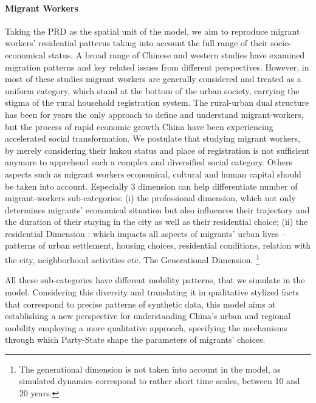 \paragraph{Migrant Workers}
Taking the PRD as the spatial unit of the model, we aim to reproduce migrant workers’ residential patterns taking into account the full range of their socio-economical status. A broad range of Chinese and western studies have examined migration patterns and key related issues from different perspectives. However, in most of these studies migrant workers are generally considered and treated as a uniform category, which stand at the bottom of the urban society, carrying the stigma of the rural household registration system. The rural-urban dual structure has been for years the only approach to define and understand migrant-workers, but the process of rapid economic growth China have been experiencing accelerated social transformation. We postulate that studying migrant workers, by merely considering their hukou status and place of registration is not sufficient anymore to apprehend such a complex and diversified social category. Others aspects such as migrant workers economical, cultural and human capital should be taken into account.
Especially 3 dimension can help differentiate number of migrant-workers sub-categories: (i) the professional dimension, which not only determines migrants’ economical situation but also influences their trajectory and the duration of their staying in the city as well as their residential choice; (ii) the residential Dimension : which impacts all aspects of migrants’ urban lives – patterns of urban settlement, housing choices, residential conditions, relation with the city, neighborhood activities etc. The Generational Dimension.  \footnote {The generational dimension is not taken into account in the model, as simulated dynamics correspond to rather short time scales, between 10 and 20 years.}



All these sub-categories have different mobility patterns, that we simulate in the model.
Considering this diversity and translating it in qualitative stylized facts that correspond to precise patterns of synthetic data, this model aims at establishing a new perspective for understanding China’s urban and regional mobility employing a more qualitative approach, specifying the mechanisms through which Party-State shape the parameters of migrants’ choices. 







